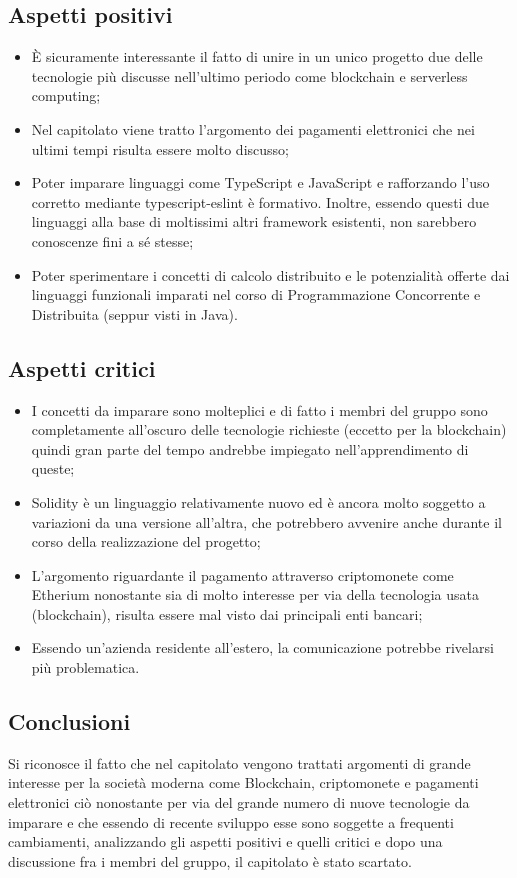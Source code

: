 \subsection{Aspetti positivi}
\begin{itemize}
\item \`E sicuramente interessante il fatto di unire in un unico progetto due delle tecnologie pi\`u discusse nell'ultimo periodo come blockchain e serverless computing;
\item Nel capitolato viene tratto l'argomento dei pagamenti elettronici che nei ultimi tempi risulta essere molto discusso;
\item Poter imparare linguaggi come TypeScript e JavaScript e rafforzando l'uso corretto mediante typescript-eslint \`e formativo. Inoltre, essendo questi due linguaggi alla base di moltissimi altri framework esistenti, non sarebbero conoscenze fini a s\'e stesse;
\item Poter sperimentare i concetti di calcolo distribuito e le potenzialit\`a offerte dai linguaggi funzionali imparati nel corso di Programmazione Concorrente e Distribuita (seppur visti in Java).
\end{itemize}

\subsection{Aspetti critici}
\begin{itemize}
\item I concetti da imparare sono molteplici e di fatto i membri del gruppo sono completamente all'oscuro delle tecnologie richieste (eccetto per la blockchain) quindi gran parte del tempo andrebbe impiegato nell'apprendimento di queste;
\item Solidity \`e un linguaggio relativamente nuovo ed \`e  ancora molto soggetto a variazioni da una versione all'altra, che potrebbero avvenire anche durante il corso della realizzazione del progetto;
\item L'argomento riguardante il pagamento attraverso criptomonete come Etherium nonostante sia di molto interesse per via della tecnologia usata (blockchain), risulta essere mal visto dai principali enti bancari;
\item Essendo un'azienda residente all'estero, la comunicazione potrebbe rivelarsi pi\`u problematica.
\end{itemize}
\subsection{Conclusioni}
Si riconosce il fatto che nel capitolato vengono trattati argomenti di grande interesse per la societ\`a moderna come Blockchain, criptomonete e pagamenti elettronici ci\`o nonostante per via del grande numero di nuove tecnologie da imparare e che essendo di recente sviluppo esse sono soggette a frequenti cambiamenti, analizzando gli aspetti positivi e quelli critici e dopo una discussione fra i membri del gruppo, il capitolato \`e  stato scartato.